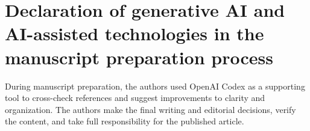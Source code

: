 \section*{Declaration of generative AI and AI-assisted technologies in the manuscript preparation process}
During manuscript preparation, the authors used OpenAI Codex as a
supporting tool to cross-check references and suggest improvements to
clarity and organization. The authors make the final writing and
editorial decisions, verify the content, and take full responsibility
for the published article.
